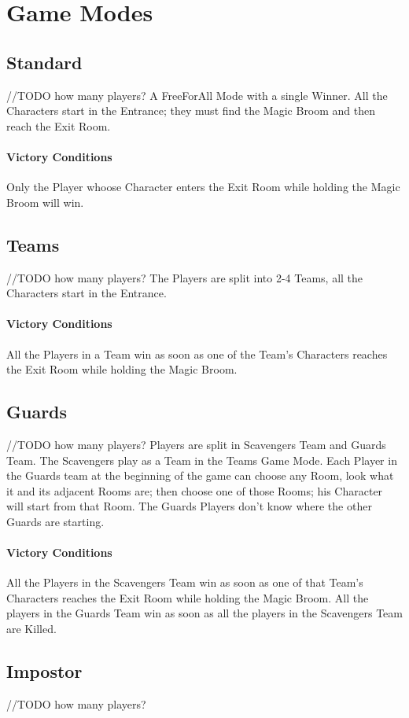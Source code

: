\section{Game Modes}

\subsection{Standard} //TODO how many players?
A Free\-For\-All Mode with a single Winner.
All the Characters start in the Entrance; they must find the Magic Broom and then reach the Exit Room.
\paragraph{Victory Conditions} Only the Player whoose Character enters the Exit Room while holding the Magic Broom will win.

\subsection{Teams} //TODO how many players?
The Players are split into 2-4 Teams, all the Characters start in the Entrance.
\paragraph{Victory Conditions} All the Players in a Team win as soon as one of the Team's Characters reaches the Exit Room while holding the Magic Broom.

\subsection{Guards} //TODO how many players?
Players are split in Scavengers Team and Guards Team.
The Scavengers play as a Team in the Teams Game Mode.
Each Player in the Guards team at the beginning of the game can choose any Room, look what it and its adjacent Rooms are; then choose one of those Rooms; his Character will start from that Room. The Guards Players don't know where the other Guards are starting.
\paragraph{Victory Conditions} All the Players in the Scavengers Team win as soon as one of that Team's Characters reaches the Exit Room while holding the Magic Broom. All the players in the Guards Team win as soon as all the players in the Scavengers Team are Killed.

\subsection{Impostor} //TODO how many players?

\pagebreak 
